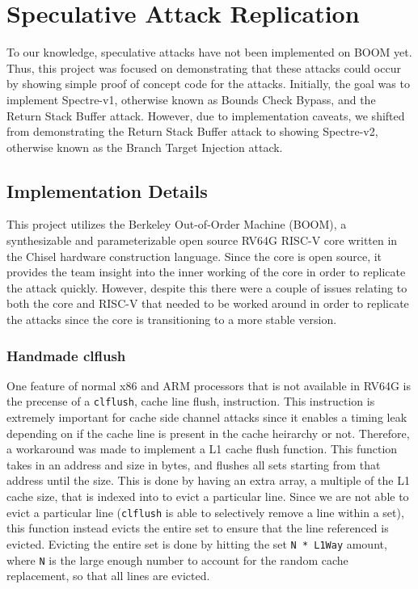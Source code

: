 \section{Speculative Attack Replication}

To our knowledge, speculative attacks have not been implemented on BOOM yet. Thus,
this project was focused on demonstrating that these attacks could occur by showing
simple proof of concept code for the attacks. Initially, the goal was to implement
Spectre-v1, otherwise known as Bounds Check Bypass, and the Return Stack Buffer attack.
However, due to implementation caveats, we shifted from demonstrating the Return Stack 
Buffer attack to showing Spectre-v2, otherwise known as the Branch Target Injection 
attack.

\subsection{Implementation Details}

This project utilizes the Berkeley Out-of-Order Machine (BOOM), a synthesizable and 
parameterizable open source RV64G RISC-V core written in the Chisel hardware construction language. 
Since the core is open source, it provides the team insight into the inner working of the core
in order to replicate the attack quickly. However, despite this there were a couple of issues 
relating to both the core and RISC-V that needed to be worked around in order to 
replicate the attacks since the core is transitioning to a more stable version.

\subsubsection{Handmade clflush}

One feature of normal x86 and ARM processors that is not available in RV64G is the precense of
a {\tt clflush}, cache line flush, instruction. This instruction is extremely important for 
cache side channel attacks since it enables a timing leak depending on if the cache line is
present in the cache heirarchy or not. Therefore, a workaround was made to implement a 
L1 cache flush function. This function takes in an address and size in bytes, and flushes
all sets starting from that address until the size. This is done by having an extra array, 
a multiple of the L1 cache size, that is indexed into to evict a particular line. Since we are
not able to evict a particular line ({\tt clflush} is able to selectively remove a line within a set),
this function instead evicts the entire set to ensure that the line referenced is evicted. Evicting
the entire set is done by hitting the set {\tt N * L1Way} amount, where {\tt N} is the large enough number to 
account for the random cache replacement, so that all lines are evicted.
